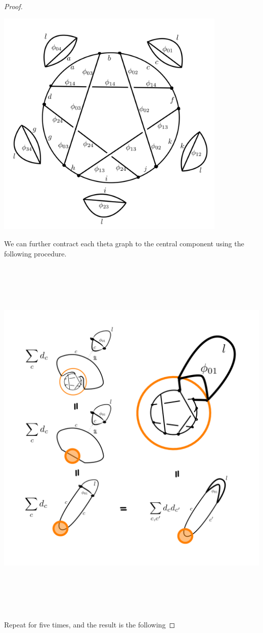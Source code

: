 \begin{proof}
  \begin{center}
    \includegraphics[height=11cm]{main-shadow-state-sum-2}
  \end{center}

  \noindent %
  We can further contract each theta graph to the central
  component using the following procedure.

  \begin{center}
    \includegraphics[height=18cm]{main-workaround}
  \end{center}
  \noindent Repeat for five times, and the result is the
  following


\end{proof}
